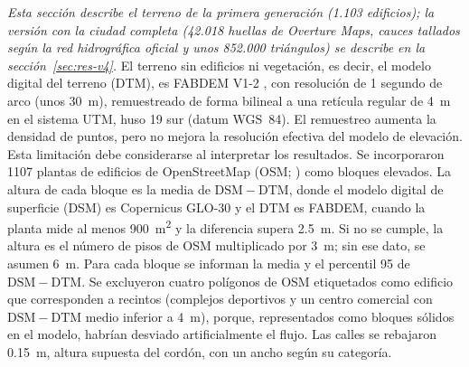 \emph{Esta sección describe el terreno de la primera generación (1.103 edificios); la versión con la ciudad completa (42.018 huellas de Overture Maps, cauces tallados según la red hidrográfica oficial y unos 852.000 triángulos) se describe en la sección~\ref{sec:res-v4}.} El terreno sin edificios ni vegetación, es decir, el modelo digital del terreno (DTM), es FABDEM V1-2 \citep{hawker2022,fabdem2023}, con resolución de 1 segundo de arco (unos \SI{30}{m}), remuestreado de forma bilineal a una retícula regular de \SI{4}{m} en el sistema UTM, huso 19 sur (datum WGS~84). El remuestreo aumenta la densidad de puntos, pero no mejora la resolución efectiva del modelo de elevación. Esta limitación debe considerarse al interpretar los resultados. Se incorporaron \num{1107} plantas de edificios de OpenStreetMap (OSM; \citealp{osm2026}) como bloques elevados. La altura de cada bloque es la media de $\mathrm{DSM}-\mathrm{DTM}$, donde el modelo digital de superficie (DSM) es Copernicus GLO-30 \citep{copernicus_glo30} y el DTM es FABDEM, cuando la planta mide al menos \SI{900}{m^2} y la diferencia supera \SI{2,5}{m}. Si no se cumple, la altura es el número de pisos de OSM multiplicado por \SI{3}{m}; sin ese dato, se asumen \SI{6}{m}. Para cada bloque se informan la media y el percentil 95 de $\mathrm{DSM}-\mathrm{DTM}$. Se excluyeron cuatro polígonos de OSM etiquetados como edificio que corresponden a recintos (complejos deportivos y un centro comercial con $\mathrm{DSM}-\mathrm{DTM}$ medio inferior a \SI{4}{m}), porque, representados como bloques sólidos en el modelo, habrían desviado artificialmente el flujo. Las calles se rebajaron \SI{0,15}{m}, altura supuesta del cordón, con un ancho según su categoría.
